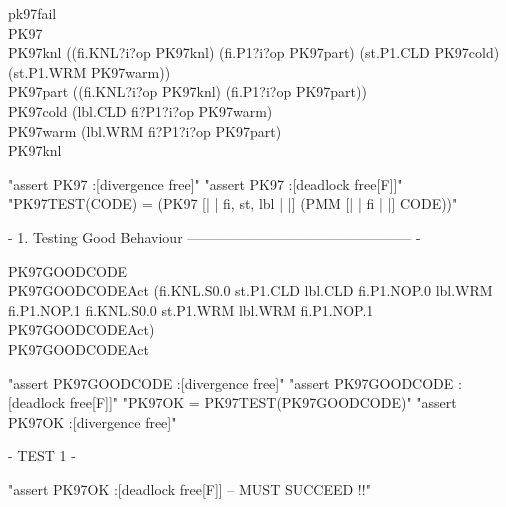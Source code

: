 \begin{circus}
\circchannel pk97fail\\

\circprocess PK97 \circdef \circbegin\\

  PK97knl \circdef ((fi.KNL?i?op \then PK97knl)  %
     \extchoice (fi.P1?i?op \then PK97part)  %
     \extchoice (st.P1.CLD \then PK97cold)
     \extchoice (st.P1.WRM \then PK97warm))\\

  PK97part \circdef ((fi.KNL?i?op \then PK97knl)  %
     \extchoice (fi.P1?i?op \then PK97part))\\  %

  PK97cold \circdef (lbl.CLD \then fi?P1?i?op \then PK97warm)\\ %

  PK97warm \circdef (lbl.WRM \then fi?P1?i?op \then PK97part)\\ %

  \circspot PK97knl\\ %
  \circend
\end{circus}
\begin{assert}
"assert PK97 :[divergence free]"
\also "assert PK97 :[deadlock free[F]]"
\also "PK97TEST(CODE) = (PK97 [| {| fi, st, lbl |} |] (PMM [| {| fi |} |] CODE))"
\end{assert}
{- 1. Testing Good Behaviour ------------------------------------------------ -}
\begin{circus}
\circprocess PK97GOODCODE \circdef \circbegin\\
PK97GOODCODEAct \circdef (fi.KNL.S0.0
  \then st.P1.CLD \then lbl.CLD \then fi.P1.NOP.0 \then lbl.WRM \then fi.P1.NOP.1
  \then fi.KNL.S0.0
  \then st.P1.WRM \then lbl.WRM \then fi.P1.NOP.1
  \then PK97GOODCODEAct)\\
 \circspot PK97GOODCODEAct\\
   \circend
\end{circus}
\begin{assert}
"assert PK97GOODCODE :[divergence free]"
\also "assert PK97GOODCODE :[deadlock free[F]]"
\also "PK97OK = PK97TEST(PK97GOODCODE)"
\also "assert PK97OK :[divergence free]"
\end{assert}
{- TEST 1 -}
\begin{assert}
"assert PK97OK :[deadlock free[F]]  -- MUST SUCCEED !!"
\end{assert}

